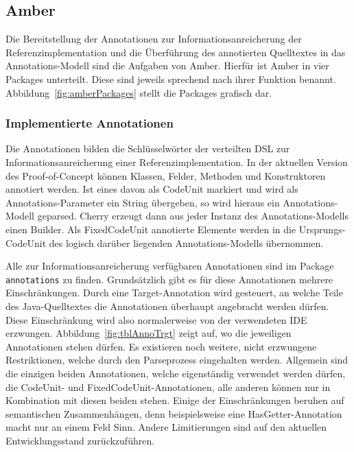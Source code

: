 \documentclass[12pt,oneside,a4paper,parskip]{scrbook}
\begin{document}
\subsection{Amber}

Die Bereitstellung der Annotationen zur Informationsanreicherung der Referenzimplementation und die Überführung des annotierten Quelltextes in das Annotations-Modell sind die Aufgaben von Amber. Hierfür ist Amber in vier Packages unterteilt. Diese sind jeweils sprechend nach ihrer Funktion benannt. Abbildung~\ref{fig:amberPackages} stellt die Packages grafisch dar.

\subsubsection{Implementierte Annotationen}

Die Annotationen bilden die Schlüsselwörter der verteilten DSL zur Informationsanreicherung einer Referenzimplementation. In der aktuellen Version des Proof-of-Concept können Klassen, Felder, Methoden und Konstruktoren annotiert werden. Ist eines davon als CodeUnit markiert und wird als Annotations-Parameter ein String übergeben, so wird hieraus ein Annotations-Modell geparsed. Cherry erzeugt dann aus jeder Instanz des Annotations-Modells einen Builder. Als FixedCodeUnit annotierte Elemente werden in die Ursprungs-CodeUnit des logisch darüber liegenden Annotations-Modells übernommen.

Alle zur Informationsanreicherung verfügbaren Annotationen sind im Package \texttt{annotations} zu finden. Grundsätzlich gibt es für diese Annotationen mehrere Einschränkungen. Durch eine Target-Annotation wird gesteuert, an welche Teile des Java-Quelltextes die Annotationen überhaupt angebracht werden dürfen. Diese Einschränkung wird also normalerweise von der verwendeten IDE erzwungen. Abbildung~\ref{fig:tblAnnoTrgt} zeigt auf, wo die jeweiligen Annotationen stehen dürfen. Es existieren noch weitere, nicht erzwungene Restriktionen, welche durch den Parseprozess eingehalten werden. Allgemein sind die einzigen beiden Annotationen, welche eigenständig verwendet werden dürfen, die CodeUnit- und FixedCodeUnit-Annotationen, alle anderen können nur in Kombination mit diesen beiden stehen. Einige der Einschränkungen beruhen auf semantischen Zusammenhängen, denn beispielsweise eine HasGetter-Annotation macht nur an einem Feld Sinn. Andere Limitierungen sind auf den aktuellen Entwicklungsstand zurückzuführen.
\end{document}
